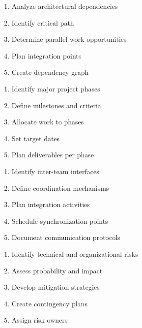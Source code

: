 \documentclass[11pt,letterpaper]{article}
\begin{document}
\begin{guidancebox}
\begin{enumerate}[nosep]
    \item Analyze architectural dependencies
    \item Identify critical path
    \item Determine parallel work opportunities
    \item Plan integration points
    \item Create dependency graph
\end{enumerate}
\end{guidancebox}

\begin{guidancebox}
\begin{enumerate}[nosep]
    \item Identify major project phases
    \item Define milestones and criteria
    \item Allocate work to phases
    \item Set target dates
    \item Plan deliverables per phase
\end{enumerate}
\end{guidancebox}

\begin{guidancebox}
\begin{enumerate}[nosep]
    \item Identify inter-team interfaces
    \item Define coordination mechanisms
    \item Plan integration activities
    \item Schedule synchronization points
    \item Document communication protocols
\end{enumerate}
\end{guidancebox}

\begin{guidancebox}
\begin{enumerate}[nosep]
    \item Identify technical and organizational risks
    \item Assess probability and impact
    \item Develop mitigation strategies
    \item Create contingency plans
    \item Assign risk owners
\end{enumerate}
\end{guidancebox}
\end{document}

